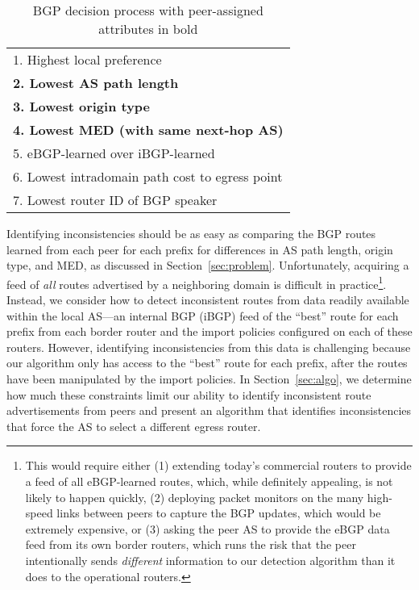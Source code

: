 \begin{table}
\begin{small}
\begin{center}
\begin{tabular}{|l|} \hline
1. Highest local preference \\
{\bf 2. Lowest AS path length}\\
{\bf 3. Lowest origin type}   \\
{\bf 4. Lowest MED (with same next-hop AS)} \\
5. eBGP-learned over iBGP-learned \\
6. Lowest intradomain path cost to egress point \\
7. Lowest router ID of BGP speaker \\
\hline
\end{tabular}
\end{center}
\end{small}
\caption{BGP decision process with peer-assigned attributes in bold}
\label{tab:decision}
\end{table}

Identifying inconsistencies should be as easy as comparing the BGP
routes learned from each peer for each prefix for differences in AS
path length, origin type, and MED, as discussed in
Section~\ref{sec:problem}.  Unfortunately, acquiring a feed of {\em
all\/} routes advertised by a neighboring domain is difficult in
practice\footnote{This would require either (1) extending today's
commercial routers to provide a feed of all eBGP-learned routes,
which, while definitely appealing, is not likely to happen quickly,
(2) deploying packet monitors on the many high-speed links between
peers to capture the BGP updates, which would be extremely
expensive, or (3) asking the peer AS to provide the eBGP data feed
from its own border routers, which runs the risk that the peer
intentionally sends {\em different\/} information to our detection
algorithm than it does to the operational routers.}.  Instead, we
consider how to detect inconsistent routes from data readily available
within the local AS---an internal BGP (iBGP) feed of the ``best''
route for each prefix from each border router and the import policies
configured on each of these routers.  However, identifying
inconsistencies from this data is challenging because our algorithm
only has access to the ``best'' route for each prefix, after the
routes have been manipulated by the import policies.  In
Section~\ref{sec:algo}, we determine how much these constraints limit
our ability to identify inconsistent route advertisements from peers
and present an algorithm that identifies inconsistencies that force
the AS to select a different egress router.


